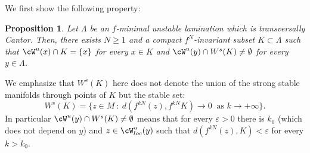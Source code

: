 \documentclass[a4paper,11pt]{amsart}
\numberwithin{equation}{section}     %
\newtheorem{prop}[teo]{Proposition}
\theoremstyle{definition}
\theoremstyle{remark}
\newcommand{\eps}{\varepsilon}
\begin{document}
We first show the following property:

\begin{prop}\label{p.section}
Let $\Lambda$ be an $f$-minimal unstable lamination which is transversally Cantor. Then, there exists $N\geq 1$ and a compact $f^N$-invariant subset $K \subset \Lambda$ such that $\cW^u(x) \cap K = \{x\}$ for every $x\in K$ and $\cW^u(y) \cap W^s(K) \neq \emptyset$ for every $y \in \Lambda$.  
\end{prop}

We emphasize that $W^s(K)$ here does not denote the union of the strong stable manifolds through points of $K$ but the stable set:
$$W^s(K) = \{ z \in M \ : \ d(f^{kN}(z), f^{kN}K) \to 0 \ \text{ as } k \to +\infty\}.$$
In particular $\cW^u(y)\cap W^s(K) \neq \emptyset$ means that for every $\eps>0$ there is $k_0$ (which does not depend on $y$) and $z \in \cW^u_{loc}(y)$ such that $d(f^{kN}(z), K) < \eps$ for every $k>k_0$. 
\end{document}

